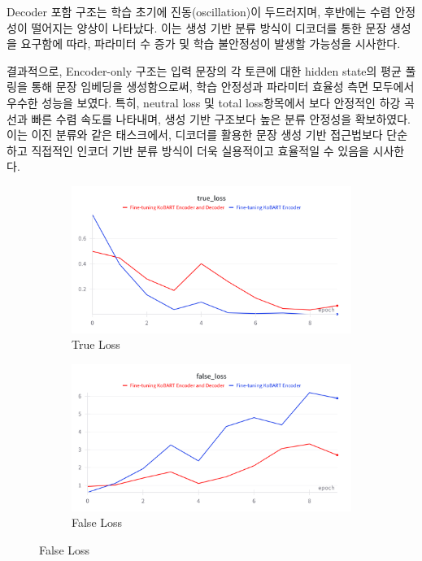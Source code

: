 \documentclass[a4paper,fleqn]{cas-sc}
\begin{document}
Decoder 포함 구조는 학습 초기에 진동(oscillation)이 두드러지며, 후반에는 수렴 안정성이 떨어지는 양상이 나타났다. 
이는 생성 기반 분류 방식이 디코더를 통한 문장 생성을 요구함에 따라, 파라미터 수 증가 및 학습 불안정성이 발생할 가능성을 시사한다.

결과적으로, Encoder-only 구조는 입력 문장의 각 토큰에 대한 hidden state의 평균 풀링을 통해 문장 임베딩을 생성함으로써, 학습 안정성과 파라미터 효율성 측면 모두에서 우수한 성능을 보였다.  
특히, neutral loss 및 total loss항목에서 보다 안정적인 하강 곡선과 빠른 수렴 속도를 나타내며, 생성 기반 구조보다 높은 분류 안정성을 확보하였다.  
이는 이진 분류와 같은 태스크에서, 디코더를 활용한 문장 생성 기반 접근법보다 단순하고 직접적인 인코더 기반 분류 방식이 더욱 실용적이고 효율적일 수 있음을 시사한다.

\begin{figure}[htbp]
    \centering
    
    \begin{subfigure}[b]{0.4\textwidth}
        \centering
        \includegraphics[width=\textwidth]{1_true_loss.png}
        \caption{True Loss}
        \label{fig:acc}
    \end{subfigure}
    \hspace{0.02\textwidth}
    \begin{subfigure}[b]{0.4\textwidth}
        \centering
        \includegraphics[width=\textwidth]{1_false_loss.png}
        \caption{False Loss}
        \label{fig:loss}
    \end{subfigure}
    

\end{figure}
\end{document}
